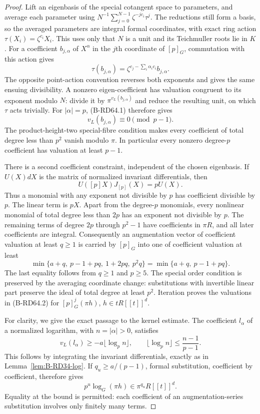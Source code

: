 \begin{proof}
Lift an eigenbasis of the special cotangent space to parameters,
and average each parameter using
$N^{-1}\sum_{j=0}^{N-1}\zeta^{-jc_i}\tau^j$.
The reductions still form a basis, so the averaged parameters
are integral formal coordinates, with exact ring action
$\tau(X_i)=\zeta^{c_i}X_i$. This uses only that $N$ is a unit
and its Teichmuller roots lie in $K$. For a coefficient
$b_{j,\alpha}$ of $X^\alpha$ in the $j$th coordinate of $[p]_G$,
commutation with this action gives
\[
 \tau(b_{j,\alpha})=
       \zeta^{c_j-\sum_i\alpha_i c_i}b_{j,\alpha}.       \tag{B-RD64.4}
\]
The opposite point-action convention reverses both exponents
and gives the same ensuing divisibility. A nonzero eigen-coefficient
has valuation congruent to its exponent modulo $N$: divide it by
$\pi^{v_L(b_{j,\alpha})}$ and reduce the resulting unit, on which
$\tau$ acts trivially. For $|\alpha|=p$, (B-RD64.1) therefore gives
\[
                         v_L(b_{j,\alpha})\equiv0\pmod{p-1}.
\]
The product-height-two special-fibre condition makes every
coefficient of total degree less than $p^2$ vanish modulo $\pi$.
In particular every nonzero degree-$p$ coefficient has valuation
at least $p-1$.

There is a second coefficient constraint, independent of the
chosen eigenbasis. If $U(X)dX$ is the matrix of normalized
invariant differentials, then
\[
                         U([p]X)J_{[p]}(X)=pU(X).
\]
Thus a monomial with any exponent not divisible by $p$ has
coefficient divisible by $p$. The linear term is $pX$.
Apart from the degree-$p$ monomials, every nonlinear monomial
of total degree less than $2p$ has an exponent not divisible
by $p$. The remaining terms of degree $2p$ through $p^2-1$
have coefficients in $\pi R$, and all later coefficients are
integral. Consequently an augmentation vector of coefficient
valuation at least $q\ge1$ is carried by $[p]_G$ into one of
coefficient valuation at least
\[
 \min\{a+q,\ p-1+pq,\ 1+2pq,\ p^2q\}
             =\min\{a+q,\ p-1+pq\}.                   \tag{B-RD64.5}
\]
The last equality follows from $q\ge1$ and $p\ge5$.
The special order condition is preserved by the averaging
coordinate change: substitutions with invertible linear part
preserve the ideal of total degree at least $p^2$.
Iteration proves the valuations in (B-RD64.2) for
$[p]^j_G(\pi h)$, $h\in tR[[t]]^d$.

For clarity, we give the exact passage to the kernel estimate.
The coefficient $l_\alpha$ of a normalized logarithm, with
$n=|\alpha|>0$, satisfies
\[
 v_L(l_\alpha)\ge-a\lfloor\log_p n\rfloor,
 \qquad \lfloor\log_p n\rfloor\le\frac{n-1}{p-1}.
\]
This follows by integrating the invariant differentials, exactly
as in Lemma~\ref{lem:B-RD34-log}. If $q_u\ge a/(p-1)$, formal
substitution, coefficient by coefficient, therefore gives
\[
               p^u\log_G(\pi h)\in\pi^{q_u}R[[t]]^d.  \tag{B-RD64.6}
\]
Equality at the bound is permitted: each coefficient of an
augmentation-series substitution involves only finitely many terms.


\end{proof}

